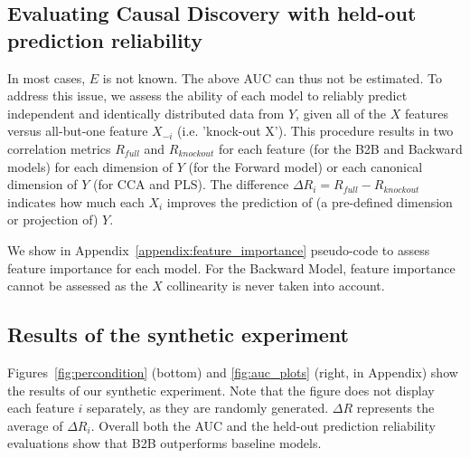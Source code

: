 \subsection{Evaluating Causal Discovery with held-out prediction reliability}

In most cases, $E$ is not known. The above AUC can thus not be estimated.
To address this issue, we assess the ability of each model to reliably predict
independent and identically distributed data from $Y$, given all of the $X$
features versus all-but-one feature $X_{-i}$ (i.e. 'knock-out X'). This
procedure results in two correlation metrics $R_{full}$ and $R_{knockout}$ for
each feature (for the B2B and Backward models) for each dimension of $Y$ (for
the Forward model) or each canonical dimension of $Y$ (for CCA and PLS). The
difference $\Delta R_i = R_{full}-R_{knockout}$ indicates how much each
$X_i$ improves the prediction of (a pre-defined dimension or projection of) $Y$.

We show in Appendix~\ref{appendix:feature_importance} pseudo-code to assess
feature importance for each model. For the Backward Model, feature importance
cannot be assessed as the $X$ collinearity is never
taken into account.

\subsection{Results of the synthetic experiment}

Figures~\ref{fig:percondition} (bottom) and \ref{fig:auc_plots} (right, in
Appendix) show the results of our synthetic experiment. Note that the figure
does not display each feature $i$ separately, as they are
randomly generated. $\Delta R$ represents the average of $\Delta R_i$.
Overall both the AUC and the held-out prediction reliability evaluations
show that B2B outperforms baseline models.
